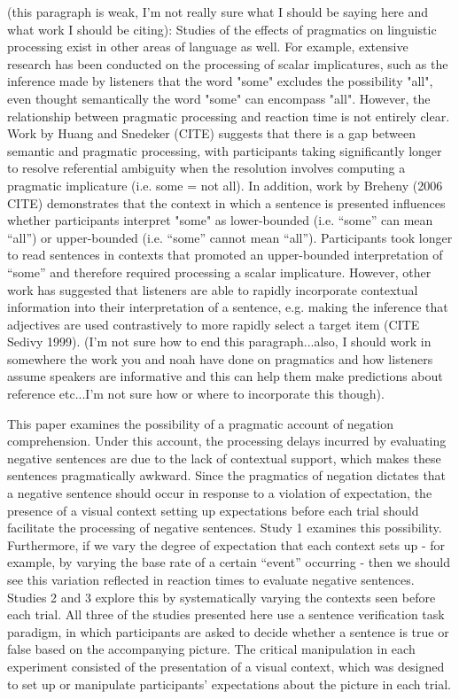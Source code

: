 \documentclass[10pt,letterpaper]{article}
\begin{document}
(this paragraph is weak, I'm not really sure what I should be saying here and what work I should be citing): Studies of the effects of pragmatics on linguistic processing exist in other areas of language as well.  For example, extensive research has been conducted on the processing of scalar implicatures, such as the inference made by listeners that the word "some" excludes the possibility "all", even thought semantically the word "some" can encompass "all".  However, the relationship between pragmatic processing and reaction time is not entirely clear.  Work by Huang and Snedeker (CITE) suggests that there is a gap between semantic and pragmatic processing, with participants taking significantly longer to resolve referential ambiguity when the resolution involves computing a pragmatic implicature (i.e. some = not all).  In addition, work by Breheny (2006 CITE) demonstrates that the context in which a sentence is presented influences whether participants interpret "some" as lower-bounded (i.e. ``some'' can mean ``all'') or upper-bounded (i.e.  ``some'' cannot mean ``all'').  Participants took longer to read sentences in contexts that promoted an upper-bounded interpretation of ``some'' and therefore required processing a scalar implicature.  However, other work has suggested that  listeners are able to rapidly incorporate contextual information into their interpretation of a sentence, e.g. making the inference that 
adjectives are used contrastively to more rapidly select a target item (CITE Sedivy 1999).  (I'm not sure how to end this paragraph...also, I should work in somewhere the work you and noah have done on pragmatics and how listeners assume speakers are informative and this can help them make predictions about reference etc...I'm not sure how or where to incorporate this though).  

This paper examines the possibility of a pragmatic account of negation comprehension.  Under this account, the processing delays incurred by evaluating negative sentences \cite{carpenter1975, just1971, just1976, hclark1972} are due to the lack of contextual support, which makes these sentences pragmatically awkward.  Since the pragmatics of negation dictates that a negative sentence should occur in response to a violation of expectation, the presence of a visual context setting up expectations before each trial should facilitate the processing of negative sentences.  Study 1 examines this possibility.  Furthermore, if we vary the degree of expectation that each context sets up - for example, by varying the base rate of a certain ``event'' occurring - then we should see this variation reflected in reaction times to evaluate negative sentences.  Studies 2 and 3 explore this by systematically varying the contexts seen before each trial.  All three of the studies presented here use a sentence verification task paradigm, in which participants are asked to decide whether a sentence is true or false based on the accompanying picture.   The critical manipulation in each experiment consisted of the presentation of a visual context, which was designed to set up or manipulate participants' expectations about the picture in each trial.  
\end{document}
